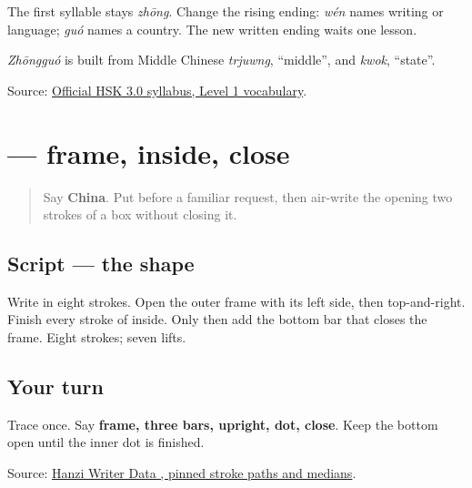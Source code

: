 The first syllable stays \emph{zhōng}. Change the rising ending: \emph{wén} names writing or language; \emph{guó} names a country. The new written ending waits one lesson.

\emph{Zhōngguó} is built from Middle Chinese \emph{trjuwng}, \textquotedblleft{}middle\textquotedblright{}, and \emph{kwok}, \textquotedblleft{}state\textquotedblright{}.

\begin{tcolorbox}[breakable,colback=teal!4,colframe=teal!35!black,title={Before you move on}]
Source: \href{https://hsk.cn-bj.ufileos.com/3.0/\%E6\%96\%B0\%E7\%89\%88HSK\%E8\%80\%83\%E8\%AF\%95\%E5\%A4\%A7\%E7\%BA\%B21219.pdf}{Official HSK 3.0 syllabus, Level 1 vocabulary}.
\end{tcolorbox}
\section[\texorpdfstring{\zh{国} (guó)}{国 (guó)}]{ — frame, inside, close}

\label{lesson:ZH-W17-guo-observe}



\begin{quote}
Say \textbf{China}. Put  before a familiar request, then air-write the opening two strokes of a box without closing it.
\end{quote}

\subsection*{Script — the shape}

Write \textbf{} in eight strokes. Open the outer frame with its left side, then top-and-right. Finish every stroke of \textbf{} inside. Only then add the bottom bar that closes the frame. Eight strokes; seven lifts.

\subsection*{Your turn}
Trace \textbf{} once. Say \textbf{frame, three bars, upright, dot, close}. Keep the bottom open until the inner dot is finished.

\begin{tcolorbox}[breakable,colback=teal!4,colframe=teal!35!black,title={Before you move on}]
Source: \href{https://raw.githubusercontent.com/chanind/hanzi-writer-data/68d10a4b21150cae5e1ebbd223eed289cf32d90c/data/\%E5\%9B\%BD.json}{Hanzi Writer Data , pinned stroke paths and medians}.
\end{tcolorbox}
